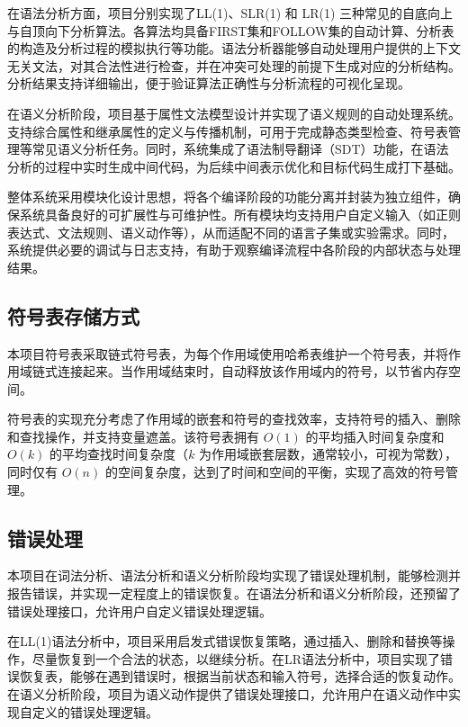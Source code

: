 \documentclass[a4paper]{article}
\begin{document}
在语法分析方面，项目分别实现了LL(1)、SLR(1) 和 LR(1) 三种常见的自底向上与自顶向下分析算法。各算法均具备FIRST集和FOLLOW集的自动计算、分析表的构造及分析过程的模拟执行等功能。语法分析器能够自动处理用户提供的上下文无关文法，对其合法性进行检查，并在冲突可处理的前提下生成对应的分析结构。分析结果支持详细输出，便于验证算法正确性与分析流程的可视化呈现。

在语义分析阶段，项目基于属性文法模型设计并实现了语义规则的自动处理系统。支持综合属性和继承属性的定义与传播机制，可用于完成静态类型检查、符号表管理等常见语义分析任务。同时，系统集成了语法制导翻译（SDT）功能，在语法分析的过程中实时生成中间代码，为后续中间表示优化和目标代码生成打下基础。

整体系统采用模块化设计思想，将各个编译阶段的功能分离并封装为独立组件，确保系统具备良好的可扩展性与可维护性。所有模块均支持用户自定义输入（如正则表达式、文法规则、语义动作等），从而适配不同的语言子集或实验需求。同时，系统提供必要的调试与日志支持，有助于观察编译流程中各阶段的内部状态与处理结果。

\subsection{符号表存储方式}

本项目符号表采取链式符号表，为每个作用域使用哈希表维护一个符号表，并将作用域链式连接起来。当作用域结束时，自动释放该作用域内的符号，以节省内存空间。

符号表的实现充分考虑了作用域的嵌套和符号的查找效率，支持符号的插入、删除和查找操作，并支持变量遮盖。该符号表拥有 $O(1)$ 的平均插入时间复杂度和 $O(k)$ 的平均查找时间复杂度（$k$ 为作用域嵌套层数，通常较小，可视为常数），同时仅有 $O(n)$ 的空间复杂度，达到了时间和空间的平衡，实现了高效的符号管理。

\subsection{错误处理}

本项目在词法分析、语法分析和语义分析阶段均实现了错误处理机制，能够检测并报告错误，并实现一定程度上的错误恢复。在语法分析和语义分析阶段，还预留了错误处理接口，允许用户自定义错误处理逻辑。

在LL(1)语法分析中，项目采用启发式错误恢复策略，通过插入、删除和替换等操作，尽量恢复到一个合法的状态，以继续分析。在LR语法分析中，项目实现了错误恢复表，能够在遇到错误时，根据当前状态和输入符号，选择合适的恢复动作。在语义分析阶段，项目为语义动作提供了错误处理接口，允许用户在语义动作中实现自定义的错误处理逻辑。
\end{document}
